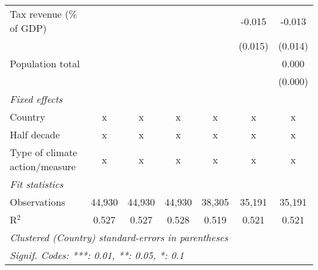 \begin{tabular}{lcccccc}
   Tax revenue (\% of GDP)                        &         &         &              &               & -0.015        & -0.013\\   
                                                  &         &         &              &               & (0.015)       & (0.014)\\   
   Population total                               &         &         &              &               &               & 0.000\\   
                                                  &         &         &              &               &               & (0.000)\\   
   \emph{Fixed effects}\\
   Country                                        & x       & x       & x            & x             & x             & x\\  
   Half decade                                    & x       & x       & x            & x             & x             & x\\  
   Type of climate action/measure                 & x       & x       & x            & x             & x             & x\\  
   \midrule \emph{Fit statistics}\\
   Observations                                   & 44,930  & 44,930  & 44,930       & 38,305        & 35,191        & 35,191\\  
   R$^2$                                          & 0.527   & 0.527   & 0.528        & 0.519         & 0.521         & 0.521\\  
   \midrule
   \multicolumn{7}{l}{\emph{Clustered (Country) standard-errors in parentheses}}\\
   \multicolumn{7}{l}{\emph{Signif. Codes: ***: 0.01, **: 0.05, *: 0.1}}\\
\end{tabular}
\par\endgroup


